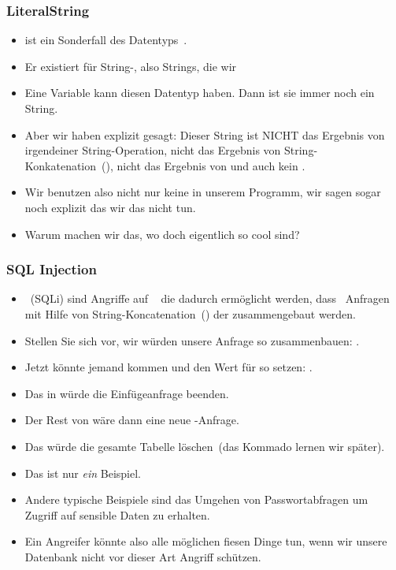 \documentclass[aspectratio=169,mathserif,notheorems]{beamer}%
\begin{document}
%
\begin{frame}%
\frametitle{LiteralString}%
\begin{itemize}%
\item {} ist ein Sonderfall des Datentyps~.%
\item<2-> Er existiert für String-, also Strings, die wir %
\item<3-> Eine Variable kann diesen Datentyp haben. Dann ist sie immer noch ein String.%
\item<4-> Aber wir haben explizit gesagt: Dieser String ist \alert{NICHT} das Ergebnis von irgendeiner String-Operation, nicht das Ergebnis von String-Konkatenation~(\pythonil{+}), nicht das Ergebnis von  und auch kein .%
\item<5-> Wir benutzen also nicht nur keine  in unserem Programm, wir sagen sogar noch explizit das wir das nicht tun.%
\item<6-> Warum machen wir das, wo  doch eigentlich so cool sind\cite{programmingWithPython}?%
\end{itemize}%
\end{frame}%
%
\begin{frame}%
\frametitle{SQL Injection}%
\begin{itemize}%
\item {}~(SQLi)\cite{ASO2024SIADPP,KDP2024AOSIAITCAIWA,CMCVGHRDCAAFL2023SIADINFD,S2008SI,databases} sind Angriffe auf \sql\  die dadurch ermöglicht werden, dass \sql\ Anfragen mit Hilfe von String-Koncatenation~(\python{+}) der  zusammengebaut werden.%
\item<2-> Stellen Sie sich vor, wir würden unsere Anfrage so zusammenbauen: .%
\item<3-> Jetzt könnte jemand kommen und den Wert für  so setzen: .%
\item<4-> Das \textil{);} in  würde die Einfügeanfrage beenden.%
\item<5-> Der Rest von  wäre dann eine neue \sql-Anfrage.%
\item<6-> Das  würde die gesamte Tabelle  löschen~(das Kommado lernen wir später).%
\item<7-> Das ist nur \emph{ein} Beispiel.%
\item<8-> Andere typische Beispiele sind das Umgehen von Passwortabfragen um Zugriff auf sensible Daten zu erhalten.%
\item<9-> Ein Angreifer könnte also alle möglichen fiesen Dinge tun, wenn wir unsere Datenbank nicht vor dieser Art Angriff schützen.%
\end{itemize}%
\end{frame}%
\end{document}
